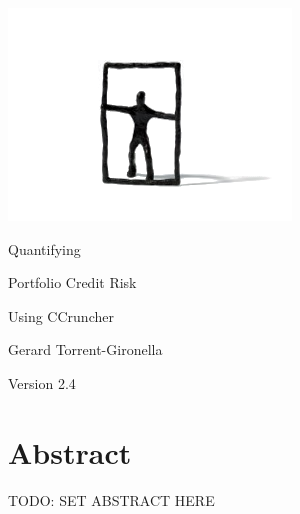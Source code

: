 \documentclass[11pt,fleqn]{book} %
\def\numversion{2.4}
\begin{document}
\begingroup
\thispagestyle{empty}
\vspace*{-2.5cm}
\centerline{\includegraphics[angle=0]{./Pictures/logo.png}}
\centering
\vspace*{0.0cm}
\par\normalfont\fontsize{35}{55}\sffamily\selectfont
Quantifying\par 
Portfolio Credit Risk\par
Using CCruncher\par
\vspace*{2.0cm}
{\huge Gerard Torrent-Gironella}\par
\vspace*{2.0cm}
\par\normalfont\fontsize{18}{18}\sffamily\selectfont
Version \numversion\par
\endgroup


\newpage

 \section*{Abstract}
TODO: SET ABSTRACT HERE

\end{document}
